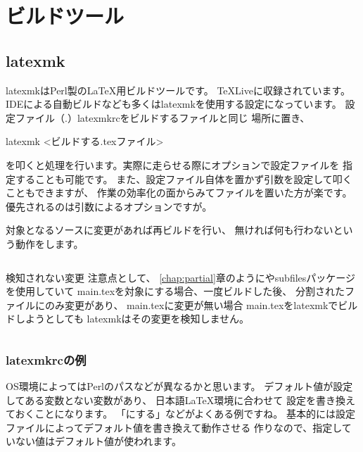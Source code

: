 \documentclass[main]{subfiles}
\begin{document}
\chapter{ビルドツール}
\begin{abstract}
\LaTeX{}の文書を完成まで持っていくには、
何度もコンパイルをしたり複数のツールを順に叩いたり
する必要があります。その補助を行うのがビルドツールです。
コマンドのようなもの、と考えてください。
\ref{chap:ci}章では\TeX{}環境全てを含めての自動化の話となりますが、
本章で紹介するのは、\TeX{}環境を構築した上で
\TeX{}文書を作成する際のビルドツールとなります。
\end{abstract}

\section{latexmk}
latexmk\cite{latexmk}はPerl製の\LaTeX{}用ビルドツールです。
\TeX{}Liveに収録されています。
IDEによる自動ビルドなども多くはlatexmkを使用する設定になっています。
設定ファイル（.）latexmkrcをビルドするファイルと同じ
場所に置き、
\begin{terminal}
latexmk <ビルドする.texファイル>
\end{terminal}
を叩くと処理を行います。実際に走らせる際にオプションで設定ファイルを
指定することも可能です。
また、設定ファイル自体を置かず引数を設定して叩くこともできますが、
作業の効率化の面からみてファイルを置いた方が楽です。
優先されるのは引数によるオプションですが。

対象となるソースに変更があれば再ビルドを行い、
無ければ何も行わないという動作をします。

\begin{column}{検知されない変更}
注意点として、
\ref{chap:partial}章のようにやsubfilesパッケージを使用していて
main.texを対象にする場合、一度ビルドした後、
分割されたファイルにのみ変更があり、
main.texに変更が無い場合
main.texをlatexmkでビルドしようとしても
latexmkはその変更を検知しません。
\end{column}

\subsection{latexmkrcの例}

OS環境によってはPerlのパスなどが異なるかと思います。
デフォルト値が設定してある変数とない変数があり、
日本語\LaTeX{}環境に合わせて
設定を書き換えておくことになります。
「にする」などがよくある例ですね。
基本的には設定ファイルによってデフォルト値を書き換えて動作させる
作りなので、指定していない値はデフォルト値が使われます。
\end{document}
